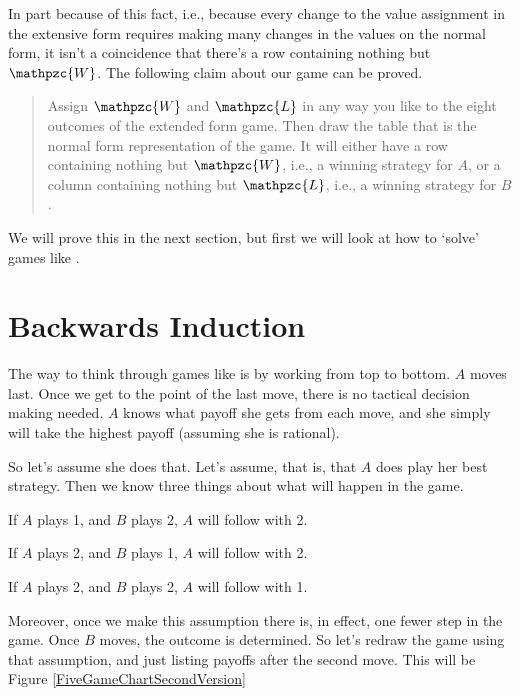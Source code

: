 \noindent In part because of this fact, i.e., because every change to the value assignment in the extensive form requires making many changes in the values on the normal form, it isn't a coincidence that there's a row containing nothing but $\mathpzc{W}$. The following claim about our game can be proved.

\begin{quote}
Assign $\mathpzc{W}$ and $\mathpzc{L}$ in any way you like to the eight outcomes of the extended form game. Then draw the table that is the normal form representation of the game. It will either have a row containing nothing but $\mathpzc{W}$, i.e., a winning strategy for $A$, or a column containing nothing but $\mathpzc{L}$, i.e., a winning strategy for $B$.
\end{quote}

\noindent We will prove this in the next section, but first we will look at how to `solve' games like .

\section{Backwards Induction}

The way to think through games like  is by working from top to bottom. $A$ moves last. Once we get to the point of the last move, there is no tactical decision making needed. $A$ knows what payoff she gets from each move, and she simply will take the highest payoff (assuming she is rational).

So let's assume she does that. Let's assume, that is, that $A$ does play her best strategy. Then we know three things about what will happen in the game.

\begin{itemize*}
\item If $A$ plays 1, and $B$ plays 2, $A$ will follow with 2.
\item If $A$ plays 2, and $B$ plays 1, $A$ will follow with 2.
\item If $A$ plays 2, and $B$ plays 2, $A$ will follow with 1.
\end{itemize*}

\noindent Moreover, once we make this assumption there is, in effect, one fewer step in the game. Once $B$ moves, the outcome is determined. So let's redraw the game using that assumption, and just listing payoffs after the second move. This will be Figure \ref{FiveGameChartSecondVersion}

